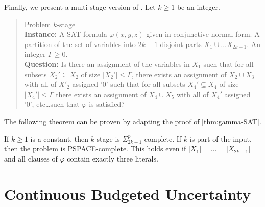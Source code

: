 Finally, we present a multi-stage version of {\radj}. Let $k \geq 1$ be an integer.

\begin{quote}
Problem $k$-stage {\radj}
\\
\textbf{Instance:}  A SAT-formula $\varphi(x,y,z)$ given in conjunctive normal form. A partition of the set of variables into $2k-1$ disjoint parts $X_1 \cup \dots X_{2k-1}$. An integer $\Gamma \geq 0$.  
\\
\textbf{Question:} Is there an assignment of the variables in $X_1$ such that for all subsets $X_2' \subseteq X_2$ of size $|X_2'| \leq \Gamma$, there exists an assignment of $X_2 \cup X_3$ with all of $X'_2$ assigned '0' such that for all subsets $X_4' \subseteq X_4$ of size $|X_4'| \leq \Gamma$ there exists an assignment of $X_4 \cup X_5$ with all of $X_4'$ assigned '0', etc\dots such that $\varphi$ is satisfied?
\end{quote}

The following theorem can be proven by adapting the proof of \cref{thm:gamma-SAT}. 

\begin{theorem}
\label{thm:multi-stage-gamma-sat}
If $k \geq 1$ is a constant, then $k$-stage {\radj} is $\Sigma_{2k-1}^p$-complete. If $k$ is part of the input, then the problem is PSPACE-complete. This holds even if $|X_1|=\dots=|X_{2k-1}|$ and all clauses of $\varphi$ contain exactly three literals.
\end{theorem}


\section{Continuous Budgeted Uncertainty}
\label{sec:contbudgeted}

